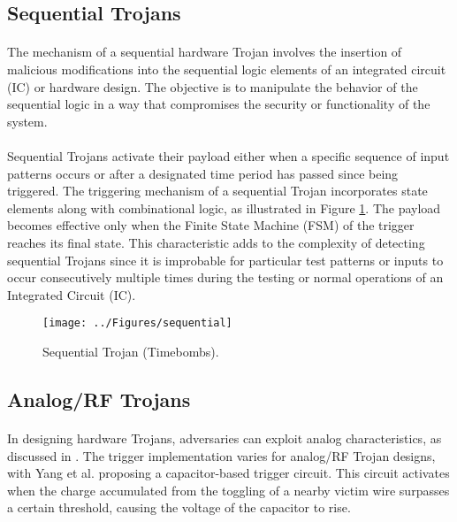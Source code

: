 \subsection{Sequential Trojans}
\paragraph*{}
The mechanism of a sequential hardware Trojan involves the insertion of malicious modifications into the sequential logic elements of an integrated circuit (IC) or hardware design. The objective is to manipulate the behavior of the sequential logic in a way that compromises the security or functionality of the system.
\paragraph*{}
Sequential Trojans activate their payload either when a specific sequence of input patterns occurs or after a designated time period has passed since being triggered. The triggering mechanism of a sequential Trojan incorporates state elements along with combinational logic, as illustrated in Figure \ref{fig:sequential}. The payload becomes effective only when the Finite State Machine (FSM) of the trigger reaches its final state. This characteristic adds to the complexity of detecting sequential Trojans since it is improbable for particular test patterns or inputs to occur consecutively multiple times during the testing or normal operations of an Integrated Circuit (IC).

\begin{figure}[h]
	\centering
	\texttt{[image: ../Figures/sequential]}
	\caption{Sequential Trojan (Timebombs).}
	\label{fig:sequential}
\end{figure}
\pagebreak
\subsection{Analog/RF Trojans}
\paragraph*{}
In designing hardware Trojans, adversaries can exploit analog characteristics, as discussed in \cite{ghandali2016design}. The trigger implementation varies for analog/RF Trojan designs, with Yang et al. \cite{yang2016a2} proposing a capacitor-based trigger circuit. This circuit activates when the charge accumulated from the toggling of a nearby victim wire surpasses a certain threshold, causing the voltage of the capacitor to rise.

